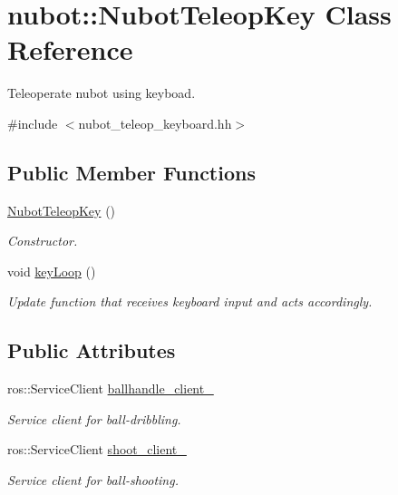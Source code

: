 \hypertarget{classnubot_1_1NubotTeleopKey}{\section{nubot\-:\-:Nubot\-Teleop\-Key Class Reference}
\label{classnubot_1_1NubotTeleopKey}
}


Teleoperate nubot using keyboad.  




{\ttfamily \#include $<$nubot\-\_\-teleop\-\_\-keyboard.\-hh$>$}

\subsection*{Public Member Functions}
\begin{DoxyCompactItemize}
\item 
\hyperlink{classnubot_1_1NubotTeleopKey_a41a4cd6c44dc169f72ca559b3dbd2ff0}{Nubot\-Teleop\-Key} ()
\begin{DoxyCompactList}\small\item\em Constructor. \end{DoxyCompactList}\item 
void \hyperlink{classnubot_1_1NubotTeleopKey_a42f6239835f4c5e6062dbc4a51328858}{key\-Loop} ()
\begin{DoxyCompactList}\small\item\em Update function that receives keyboard input and acts accordingly. \end{DoxyCompactList}\end{DoxyCompactItemize}
\subsection*{Public Attributes}
\begin{DoxyCompactItemize}
\item 
ros\-::\-Service\-Client \hyperlink{classnubot_1_1NubotTeleopKey_a194eb225b4f90ce108cfd69ab02a0c98}{ballhandle\-\_\-client\-\_\-}
\begin{DoxyCompactList}\small\item\em Service client for ball-\/dribbling. \end{DoxyCompactList}\item 
ros\-::\-Service\-Client \hyperlink{classnubot_1_1NubotTeleopKey_a944cfba55efc7f7ef7ed9acd17c7f676}{shoot\-\_\-client\-\_\-}
\begin{DoxyCompactList}\small\item\em Service client for ball-\/shooting. \end{DoxyCompactList}\end{DoxyCompactItemize}
